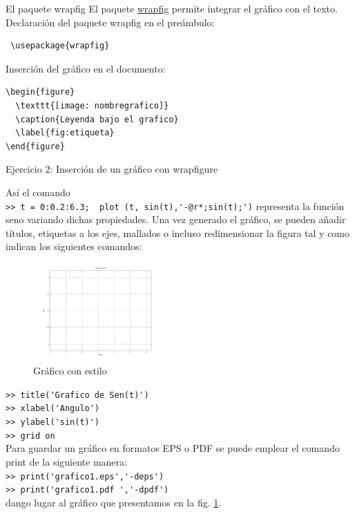 \documentclass{beamer}
\begin{document}
\begin{frame}[fragile]{El paquete wrapfig}
El paquete  \href{http://www.ctan.org/pkg/wrapfig}{wrapfig} permite integrar el gr\'afico con el texto.
\vskip 12pt
Declaraci\'on del paquete wrapfig en el pre\'ambulo:
\begin{verbatim} \usepackage{wrapfig} \end{verbatim}

Inserci\'on del gr\'afico en el documento:
\begin{verbatim}
\begin{figure}
  \texttt{[image: nombregrafico]}
  \caption{Leyenda bajo el grafico}
  \label{fig:etiqueta}
\end{figure}
\end{verbatim}

\end{frame}


\begin{frame}[fragile]
\begin{exampleblock}{Ejercicio 2: Inserci\'on de un gr\'afico con wrapfigure}
{\small As\'i el comando
\\%
\verb|>> t = 0:0.2:6.3;  plot (t, sin(t),'-@r*;sin(t);')|
representa la funci\'on seno variando dichas propiedades.
Una vez generado el gr\'afico, se pueden a\~nadir t\'itulos, etiquetas a los ejes, mallados o incluso redimensionar la figura
tal y como indican los siguientes comandos:\\%
\begin{figure}
\begin{center}
\vspace{-30pt}
\includegraphics[width=5cm]{graficos/sin.pdf}
  \end{center}
\vspace{-25pt}
  \caption{{\tiny Gr\'afico con estilo \label{figura:sinestilo1}}}
\end{figure}
\verb|>> title('Grafico de Sen(t)')|
\\%
\verb|>> xlabel('Angulo')|
\\%
\verb|>> ylabel('sin(t)')|
\\%
\verb|>> grid on|
\\%

Para guardar un gr\'afico en formatos EPS o PDF se puede emplear el comando print de la siguiente manera:
\\
\verb|>> print('grafico1.eps','-deps')| \\
\verb|>> print('grafico1.pdf ','-dpdf')| \\
dango lugar al gr\'afico que presentamos en la fig. \ref{figura:sinestilo1}.
}
\end{exampleblock}
\end{frame}
\end{document}
